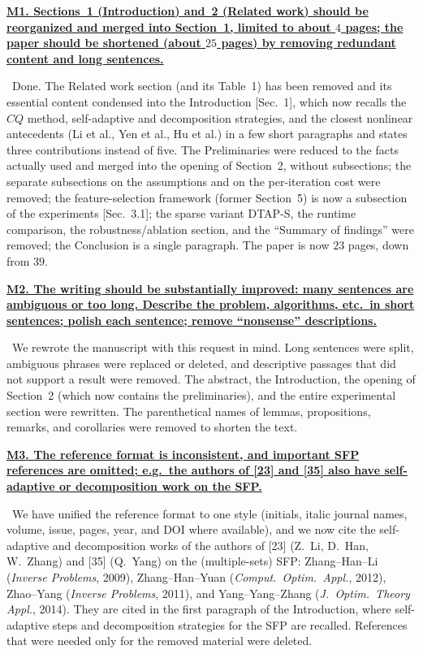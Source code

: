 \documentclass[11pt]{article}
\newcommand{\response}[1]{\smallskip\noindent{\color{blue!60!black}\textbf{Response.}}\ #1\par\medskip}
\newcommand{\loc}[1]{\textcolor{blue!50!black}{[#1]}}
\newenvironment{point}[1]{\medskip\noindent\textbf{\uline{#1}}\par}{\par}
\begin{document}
\begin{point}{M1. Sections~1 (Introduction) and~2 (Related work) should be reorganized and merged into Section~1, limited to about $4$ pages; the paper should be shortened (about $25$ pages) by removing redundant content and long sentences.}
\response{Done. The Related work section (and its Table~1) has been removed and its essential content condensed into the Introduction \loc{Sec.~1}, which now recalls the $CQ$ method, self-adaptive and decomposition strategies, and the closest nonlinear antecedents (Li et al., Yen et al., Hu et al.) in a few short paragraphs and states three contributions instead of five. The Preliminaries were reduced to the facts actually used and merged into the opening of Section~2, without subsections; the separate subsections on the assumptions and on the per-iteration cost were removed; the feature-selection framework (former Section~5) is now a subsection of the experiments \loc{Sec.~3.1}; the sparse variant DTAP-S, the runtime comparison, the robustness/ablation section, and the ``Summary of findings'' were removed; the Conclusion is a single paragraph. The paper is now $23$ pages, down from $39$.}
\end{point}

\begin{point}{M2. The writing should be substantially improved: many sentences are ambiguous or too long. Describe the problem, algorithms, etc.\ in short sentences; polish each sentence; remove ``nonsense'' descriptions.}
\response{We rewrote the manuscript with this request in mind. Long sentences were split, ambiguous phrases were replaced or deleted, and descriptive passages that did not support a result were removed. The abstract, the Introduction, the opening of Section~2 (which now contains the preliminaries), and the entire experimental section were rewritten. The parenthetical names of lemmas, propositions, remarks, and corollaries were removed to shorten the text.}
\end{point}

\begin{point}{M3. The reference format is inconsistent, and important SFP references are omitted; e.g.\ the authors of [23] and [35] also have self-adaptive or decomposition work on the SFP.}
\response{We have unified the reference format to one style (initials, italic journal names, volume, issue, pages, year, and DOI where available), and we now cite the self-adaptive and decomposition works of the authors of [23] (Z.~Li, D.~Han, W.~Zhang) and [35] (Q.~Yang) on the (multiple-sets) SFP: Zhang--Han--Li (\emph{Inverse Problems}, 2009), Zhang--Han--Yuan (\emph{Comput.\ Optim.\ Appl.}, 2012), Zhao--Yang (\emph{Inverse Problems}, 2011), and Yang--Yang--Zhang (\emph{J.\ Optim.\ Theory Appl.}, 2014). They are cited in the first paragraph of the Introduction, where self-adaptive steps and decomposition strategies for the SFP are recalled. References that were needed only for the removed material were deleted.}
\end{point}
\end{document}

